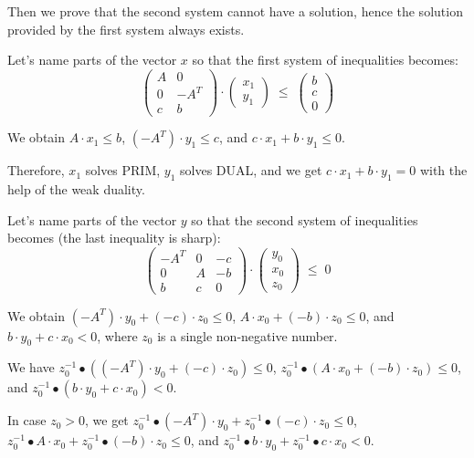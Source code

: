 \documentclass[]{article}
\begin{document}
Then we prove that the second system cannot have a solution,
hence the solution provided by the first system always exists.

Let's name parts of the vector $x$ so that the first system of inequalities becomes:
$$
\begin{pmatrix}
	A & 0 \\
	0 & -A^T \\
	c & b
\end{pmatrix}
\cdot
\begin{pmatrix}
	x_1 \\
	y_1
\end{pmatrix}
\;\le\;
\begin{pmatrix}
	b \\
	c \\
	0
\end{pmatrix}
$$

We obtain $A \cdot x_1 \le b$, $(-A^T) \cdot y_1 \le c$, and
$c \cdot x_1 + b \cdot y_1 \le 0$.

Therefore, $x_1$ solves PRIM, $y_1$ solves DUAL, and we get
$c \cdot x_1 + b \cdot y_1 = 0$ with the help of the weak duality.
\bigskip

Let's name parts of the vector $y$ so that the second system of inequalities becomes
(the last inequality is sharp):
$$
\begin{pmatrix}
	-A^T & 0 & -c \\
	0 & A & -b \\
	b & c & 0
\end{pmatrix}
\cdot
\begin{pmatrix}
	y_0 \\
	x_0 \\
	z_0
\end{pmatrix}
\;\le\;
0
$$

We obtain
$(-A^T) \cdot y_0 + (-c) \cdot z_0 \le 0$,
$A \cdot x_0 + (-b) \cdot z_0 \le 0$, and
$b \cdot y_0 + c \cdot x_0 < 0$, where
$z_0$ is a single non-negative number.



We have $z_0^{-1} \bullet ((-A^T) \cdot y_0 + (-c) \cdot z_0) \le 0$,
$z_0^{-1} \bullet (A \cdot x_0 + (-b) \cdot z_0) \le 0$, and
$z_0^{-1} \bullet (b \cdot y_0 + c \cdot x_0) < 0$.

In case $z_0 > 0$, we get
$z_0^{-1} \bullet (-A^T) \cdot y_0 + z_0^{-1} \bullet (-c) \cdot z_0 \le 0$,
$z_0^{-1} \bullet A \cdot x_0 + z_0^{-1} \bullet (-b) \cdot z_0 \le 0$, and
$z_0^{-1} \bullet b \cdot y_0 + z_0^{-1} \bullet c \cdot x_0 < 0$.
\end{document}
